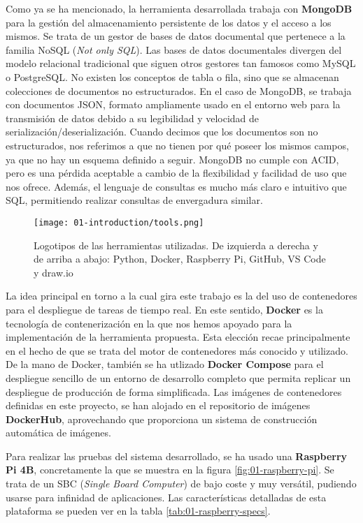 Como ya se ha mencionado, la herramienta desarrollada trabaja con
\textbf{MongoDB} para la gestión del almacenamiento persistente de los datos y
el acceso a los mismos. Se trata de un gestor de bases de datos documental que
pertenece a la familia NoSQL (\textit{Not only SQL}). Las bases de datos
documentales divergen del modelo relacional tradicional que siguen otros
gestores tan famosos como MySQL o PostgreSQL. No existen los conceptos de tabla
o fila, sino que se almacenan colecciones de documentos no estructurados. En el
caso de MongoDB, se trabaja con documentos JSON, formato ampliamente usado en el
entorno web para la transmisión de datos debido a su legibilidad y velocidad de
serialización/deserialización. Cuando decimos que los documentos son no
estructurados, nos referimos a que no tienen por qué poseer los mismos campos,
ya que no hay un esquema definido a seguir. MongoDB no cumple con ACID, pero es
una pérdida aceptable a cambio de la flexibilidad y facilidad de uso que nos
ofrece. Además, el lenguaje de consultas es mucho más claro e intuitivo que SQL,
permitiendo realizar consultas de envergadura similar.

\begin{figure}[H]
    \centering
    \texttt{[image: 01-introduction/tools.png]}
    \caption{Logotipos de las herramientas utilizadas. De izquierda a derecha y%
        de arriba a abajo: Python, Docker, Raspberry Pi, GitHub, VS Code y
        draw.io}
    \label{fig:01-tools}
\end{figure}

La idea principal en torno a la cual gira este trabajo es la del uso de
contenedores para el despliegue de tareas de tiempo real. En este sentido,
\textbf{Docker} es la tecnología de contenerización en la que nos hemos apoyado
para la implementación de la herramienta propuesta. Esta elección recae
principalmente en el hecho de que se trata del motor de contenedores más
conocido y utilizado. De la mano de Docker, también se ha utlizado
\textbf{Docker Compose} para el despliegue sencillo de un entorno de desarrollo
completo que permita replicar un despliegue de producción de forma simplificada.
Las imágenes de contenedores definidas en este proyecto, se han alojado en el
repositorio de imágenes \textbf{DockerHub}, aprovechando que proporciona un
sistema de construcción automática de imágenes.

Para realizar las pruebas del sistema desarrollado, se ha usado una
\textbf{Raspberry Pi 4B}, concretamente la que se muestra en la figura
\ref{fig:01-raspberry-pi}. Se trata de un SBC (\textit{Single Board Computer})
de bajo coste y muy versátil, pudiendo usarse para infinidad de aplicaciones.
Las características detalladas de esta plataforma se pueden ver en la tabla \ref{tab:01-raspberry-specs}.


